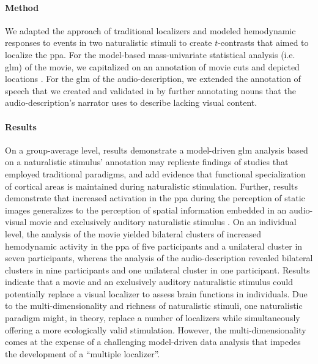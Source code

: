 \paragraph{Method}

We adapted the approach of traditional localizers and modeled hemodynamic
responses to events in two naturalistic stimuli to create $t$-contrasts that
aimed to localize the \ac{ppa}.
For the model-based mass-univariate statistical analysis (i.e. \ac{glm}) of the
movie, we capitalized on an annotation of movie cuts and depicted locations
\citep{haeusler2016cutanno}.
For the \ac{glm} of the audio-description, we extended the annotation of speech
that we created and validated in \citep{haeusler2021speechanno} by further
annotating nouns that the audio-description's narrator uses to describe lacking
visual content.


\paragraph{Results}

On a group-average level, results demonstrate a model-driven \ac{glm} analysis
based on a naturalistic stimulus' annotation may replicate findings of studies
that employed traditional paradigms, and add evidence
\citep[cf.][]{bartels2004mapping} that functional specialization of cortical
areas is maintained during naturalistic stimulation.
Further, results demonstrate that increased activation in the \ac{ppa} during
the perception of static images generalizes to the perception of spatial
information embedded in an audio-visual movie and exclusively auditory
naturalistic stimulus \citep{haeusler2022processing}.
On an individual level, the analysis of the movie yielded bilateral clusters of
increased hemodynamic activity in the \ac{ppa} of five participants and a
unilateral cluster in seven participants, whereas the analysis of the
audio-description revealed bilateral clusters in nine participants and one
unilateral cluster in one participant.
Results indicate that a movie and an exclusively auditory naturalistic stimulus
could potentially replace a visual localizer to assess brain functions in
individuals.
%
Due to the multi-dimensionality and richness of naturalistic stimuli, one
naturalistic paradigm might, in theory, replace a number of localizers while
simultaneously offering a more ecologically valid stimulation.
%
However, the multi-dimensionality comes at the expense of a challenging
model-driven data analysis that impedes the development of a ``multiple
localizer''.


